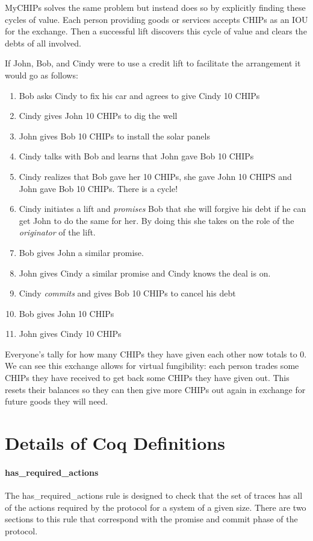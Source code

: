 \documentclass[runningheads]{llncs}
\begin{document}
MyCHIPs solves the same problem but instead does so by explicitly finding these cycles of value. Each person providing goods or services accepts CHIPs as an IOU for the exchange. Then a successful lift discovers this cycle of value and clears the debts of all involved.

If John, Bob, and Cindy were to use a credit lift to facilitate the arrangement it would go as follows:
\begin{enumerate}
\item Bob asks Cindy to fix his car and agrees to give Cindy 10 CHIPs 
\item Cindy gives John 10 CHIPs to dig the well
\item John gives Bob 10 CHIPs to install the solar panels
\item Cindy talks with Bob and learns that John gave Bob 10 CHIPs
\item Cindy realizes that Bob gave her 10 CHIPs, she gave John 10 CHIPS and John gave Bob 10 CHIPs. There is a cycle!
\item Cindy initiates a lift and \emph{promises} Bob that she will forgive his debt if he can get John to do the same for her. By doing this she takes on the role of the \emph{originator} of the lift. 
\item Bob gives John a similar promise.
\item John gives Cindy a similar promise and Cindy knows the deal is on.
\item Cindy \emph{commits} and gives Bob 10 CHIPs to cancel his debt
\item Bob gives John 10 CHIPs
\item John gives Cindy 10 CHIPs
\end{enumerate}
Everyone's tally for how many CHIPs they have given each other now totals to 0.
We can see this exchange allows for virtual fungibility: each person trades some CHIPs they have received to get back some CHIPs they have given out. 
This resets their balances so they can then give more CHIPs out again in exchange for future goods they will need. 

\section{Details of Coq Definitions}\label{apdx:coq_detail}

\paragraph{has\_required\_actions}
The has\_required\_actions rule is designed to check that the set of traces has all of the actions required by the protocol for a system of a given size. There are two sections to this rule that correspond with the promise and commit phase of the protocol. 
\end{document}
